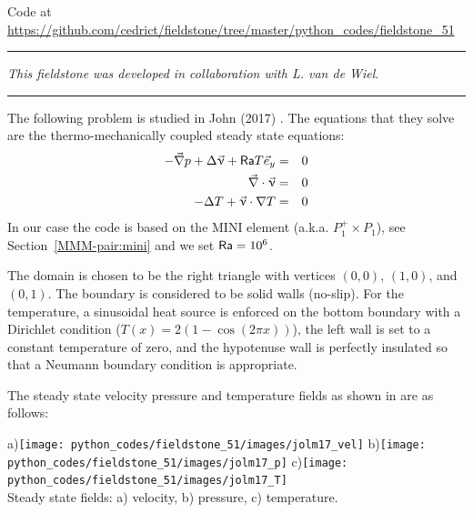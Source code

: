 

\begin{center}
Code at \url{https://github.com/cedrict/fieldstone/tree/master/python_codes/fieldstone_51}
\end{center}

\par\noindent\rule{\textwidth}{0.4pt}

{\sl This fieldstone was developed in collaboration with L. van de Wiel}. 

\par\noindent\rule{\textwidth}{0.4pt}


The following problem is studied in John \etal (2017) \cite{jolm17}. 
The equations that they solve are the thermo-mechanically coupled steady state equations:
\begin{eqnarray}
-\vec{\nabla}p + \Delta \vec{\upnu} + {\mathsf{Ra}} T \vec{e}_y &=& 0\\
\vec\nabla\cdot\vec\upnu &=& 0 \\
-\Delta T + \vec\upnu\cdot\nabla T &=& 0
\end{eqnarray}
In our case the code is based on the MINI element (a.k.a. $P_1^+ \times P_1$), 
see Section~\ref{MMM-pair:mini}
and we set ${\mathsf{Ra}}=10^6$.

The domain is chosen to be the right triangle
with vertices $(0,0)$, $(1,0)$, and $(0,1)$. 
The boundary is considered to be solid walls (no-slip).
For the temperature, a sinusoidal heat source is enforced on the bottom
boundary with a Dirichlet condition ($T(x)=2(1-\cos (2\pi x))$), 
the left wall is set to a constant temperature
of zero, and the hypotenuse wall is perfectly insulated so that a Neumann 
boundary condition is appropriate.

The steady state velocity pressure and temperature fields as shown in 
\cite{jolm17} are as follows:

\begin{center}
a)\texttt{[image: python\_codes/fieldstone\_51/images/jolm17\_vel]}
b)\texttt{[image: python\_codes/fieldstone\_51/images/jolm17\_p]}
c)\texttt{[image: python\_codes/fieldstone\_51/images/jolm17\_T]}\\
{\small Steady state fields: a) velocity, b) pressure, c) temperature.}
\end{center}

